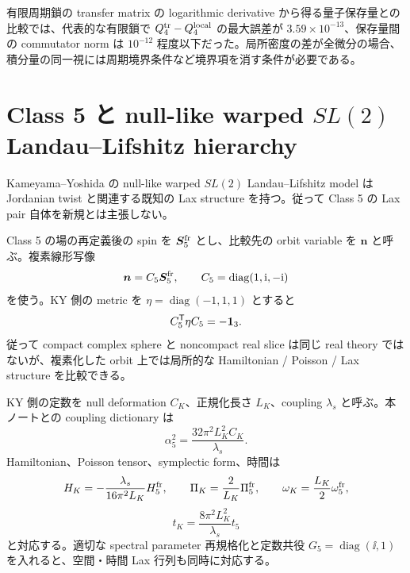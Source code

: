 有限周期鎖の transfer matrix の logarithmic derivative から得る量子保存量との比較では、代表的な有限鎖で $Q_4^{\rm tr}-Q_4^{\rm local}$ の最大誤差が $3.59\times10^{-13}$、保存量間の commutator norm は $10^{-12}$ 程度以下だった。局所密度の差が全微分の場合、積分量の同一視には周期境界条件など境界項を消す条件が必要である。

\section{Class 5 と null-like warped $SL(2)$ Landau--Lifshitz hierarchy}
Kameyama--Yoshida の null-like warped $SL(2)$ Landau--Lifshitz model は Jordanian twist と関連する既知の Lax structure を持つ\cite{KY2014}。従って Class 5 の Lax pair 自体を新規とは主張しない。

Class 5 の場の再定義後の spin を $\boldsymbol S_5^{\rm fr}$ とし、比較先の orbit variable を $\boldsymbol n$ と呼ぶ。複素線形写像
\begin{equation}
\boldsymbol n=C_5\boldsymbol S_5^{\rm fr},
\qquad C_5=\operatorname{diag}(1,\mathrm i,-\mathrm i)
\label{eq:C5KYmap}
\end{equation}
を使う。KY 側の metric を $\eta=\operatorname{diag}(-1,1,1)$ とすると
\begin{equation}
C_5^{\mathsf T}\eta C_5=-\mathbf 1_{3}.
\end{equation}
従って compact complex sphere と noncompact real slice は同じ real theory ではないが、複素化した orbit 上では局所的な Hamiltonian / Poisson / Lax structure を比較できる。

KY 側の定数を null deformation $C_K$、正規化長さ $L_K$、coupling $\lambda_s$ と呼ぶ。本ノートとの coupling dictionary は
\begin{equation}
\alpha_5^2=\frac{32\pi^2L_K^2C_K}{\lambda_s}.
\label{eq:C5KYcoupling}
\end{equation}
Hamiltonian、Poisson tensor、symplectic form、時間は
\begin{equation}
H_K=-\frac{\lambda_s}{16\pi^2L_K}H_5^{\rm fr},
\qquad
\Pi_K=\frac2{L_K}\Pi_5^{\rm fr},
\qquad
\omega_K=\frac{L_K}{2}\omega_5^{\rm fr},
\label{eq:C5KYPoisson}
\end{equation}
\begin{equation}
t_K=\frac{8\pi^2L_K^2}{\lambda_s}t_5
\label{eq:C5KYtime}
\end{equation}
と対応する。適切な spectral parameter 再規格化と定数共役 $G_5=\operatorname{diag}(\ii,1)$ を入れると、空間・時間 Lax 行列も同時に対応する。

